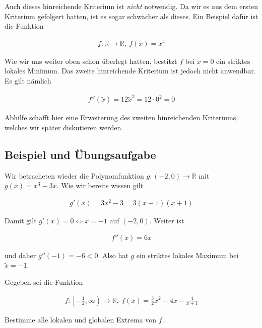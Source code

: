 \documentclass[fontsize=9pt,
               parskip=half-,
               DIV=14,
               listof=chapterentry,
               tocflat]{scrbook}
\begin{document}
\begin{warning*}
Auch dieses hinreichende Kriterium ist \emph{nicht} notwendig. Da wir es aus dem ersten Kriterium gefolgert hatten, ist es sogar schwächer als dieses. Ein Beispiel dafür ist die Funktion

\begin{align*}
f:\mathbb {R} \to \mathbb {R} ,\ f(x)=x^{4}
\end{align*}

Wie wir uns weiter oben schon überlegt hatten, bestitzt $f$ bei ${\tilde {x}}=0$ ein striktes lokales Minimum. Das zweite hinreichende Kriterium ist jedoch nicht anwendbar. Es gilt nämlich

\begin{align*}
f''({\tilde {x}})=12{\tilde {x}}^{2}=12\cdot 0^{2}=0
\end{align*}

Abhilfe schafft hier eine Erweiterung des zweiten hinreichenden Kriteriums, welches wir später diskutieren werden.

\end{warning*}

\subsection{Beispiel und Übungsaufgabe}

\begin{example*}
Wir betracheten wieder die Polynomfunktion $g:(-2,0)\to \mathbb {R} $ mit $g(x)=x^{3}-3x$. Wie wir bereits wissen gilt

\begin{align*}
g'(x)=3x^{2}-3=3(x-1)(x+1)
\end{align*}

Damit gilt $g'(x)=0\iff x=-1$ auf $(-2,0)$. Weiter ist

\begin{align*}
f''(x)=6x
\end{align*}

und daher $g''(-1)=-6<0$. Also hat $g$ ein striktes lokales Maximum bei ${\tilde {x}}=-1$.

\end{example*}

\begin{exercise*}
Gegeben sei die Funktion

\begin{align*}
f:\left[-{\tfrac {1}{2}},\infty \right)\to \mathbb {R} ,\ f(x)={\tfrac {3}{2}}x^{2}-4x-{\tfrac {4}{x+1}}
\end{align*}

Bestimme alle lokalen und globalen Extrema von $f$.

\end{exercise*}
\end{document}

